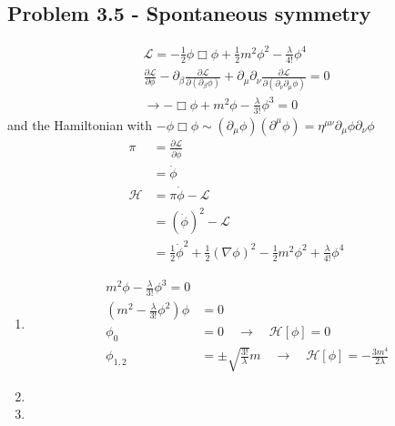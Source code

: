 \documentclass[../main.tex]{subfiles}
\begin{document}
\subsection{Problem 3.5 - Spontaneous symmetry}
\begin{align}
\mathscr{L}=-\frac{1}{2}\phi\Box\phi+\frac{1}{2}m^2\phi^2-\frac{\lambda}{4!}\phi^4\\
    \frac{\partial\mathscr{L}}{\partial \phi}-\partial_\beta\frac{\partial\mathscr{L}}{\partial(\partial_\beta \phi)}+\partial_\mu\partial_\nu\frac{\partial \mathcal{L}}{\partial(\partial_\nu\partial_\mu\phi)}=0\\
    \rightarrow -\Box\phi+m^2\phi-\frac{\lambda}{3!}\phi^3=0
\end{align}
and the Hamiltonian with $-\phi\Box\phi\sim(\partial_\mu\phi)(\partial^\mu\phi)=\eta^{\mu\nu}\partial_\mu\phi\partial_\nu\phi$
\begin{align}
\pi
&=\frac{\partial\mathcal{L}}{\partial\dot\phi}\\
&=\dot\phi\\
\mathcal{H}
&=\pi\dot\phi-\mathcal{L}\\
&=(\dot\phi)^2-\mathcal{L}\\
&=\frac{1}{2}\dot\phi^2+\frac{1}{2}(\nabla\phi)^2-\frac{1}{2}m^2\phi^2+\frac{\lambda}{4!}\phi^4
\end{align}
\begin{enumerate}[label=(\alph*)]
\item 
\begin{align}
m^2\phi-\frac{\lambda}{3!}\phi^3=0\\
(m^2-\frac{\lambda}{3!}\phi^2)\phi&=0\\
\phi_0&=0\quad\rightarrow\quad\mathcal{H}[\phi]=0\\
\phi_{1,2}&=\pm\sqrt{\frac{3!}{\lambda}}m\quad\rightarrow\quad\mathcal{H}[\phi]=-\frac{3m^4}{2\lambda}
\end{align} 

\item
\item   
\end{enumerate}
\end{document}
